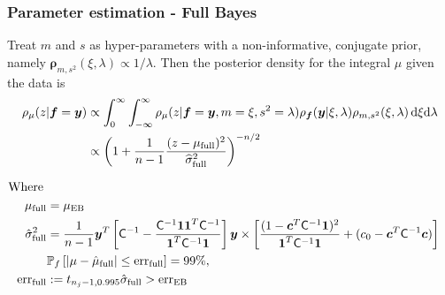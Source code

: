 \documentclass[handout, 10pt,compress,xcolor={usenames,dvipsnames}]{beamer} %
\newcommand{\bm}[1]{\boldsymbol{#1}}
\newcommand{\MLE}{\textup{EB}}
\newcommand{\full}{\textup{full}}
\newcommand{\D}[1]{\text{d}{#1}}
\newcommand{\vrho}{\bm{\rho}}
\newcommand{\err}{{\text{err}}}
\newcommand{\pause}{}
\begin{document}
\begin{frame}
\frametitle{Parameter estimation - Full Bayes}
\vspace*{-6ex}
Treat $m$ and $s$ as hyper-parameters with a non-informative, conjugate prior, namely $\vrho_{m,s^2}(\xi, \lambda) \propto 1/\lambda$.
Then the posterior density for the integral $\mu$ given the data is
\vspace*{-2.0ex}
\begin{align*}
\rho_{\mu}(z | \vf = \vy)
& \propto \int_{0}^\infty \int_{-\infty}^\infty \rho_{\mu}(z | \vf = \vy, m = \xi, s^2 = \lambda)  
\rho_{\vf}(\vy | \xi, \lambda ) \rho_{m, s^2}(\xi, \lambda) \, \D \xi \D \lambda 
\\ & \propto \left(1 +  \frac{1}{n-1} \frac{(z - \mu_{\full})^2}{\widehat{\sigma}_{\full}^2} \right)^{-n/2}
\end{align*}
\pause
\vspace{-4ex}
\begin{align*}
\text{Where} \;
\\
\mu_{\full} &= \mu_\MLE
\\
\hsigma^2_{\full} 
& = \frac{1}{n-1}
\vy^T\left[ \mC^{-1} 
- \frac{ \mC^{-1} \vone\vone^T \mC^{-1}}{\vone^T \mC^{-1} \vone}  \right]\vy
\times  \left[\frac{(1 - \vc^T \mC^{-1} \vone)^2}{\vone^T \mC^{-1} \vone} + (c_0  -\vc ^T \mC^{-1} \vc) \right]
\\ &\mathbb{P}_f \left[ |\mu-\hmu_{\full}|  \leq \err_{\full} \right]  = 99\%,
\\ \err_{\full} &:= t_{n_j-1,0.995} \hat{\sigma}_{\full} > \err_{\MLE}
\end{align*}
\end{frame}
























\end{document}
